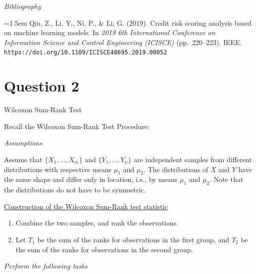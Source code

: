 \documentclass[letterpaper]{article}
\begin{document}
		\medskip
		
		\textit{Bibliography}
		
		\hangindent=1.5em
		Qiu, Z., Li, Y., Ni, P., \& Li, G. (2019). Credit risk scoring analysis based on machine learning models. In \textit{2019 6th International Conference on Information Science and Control Engineering (ICISCE)} (pp.\ 220--223). IEEE. \texttt{https://doi.org/10.1109/ICISCE48695.2019.00052}
		
		\clearpage
		
		\section{Question 2}
		{\color{deepred} Wilcoxon Sum-Rank Test}
		
		\medskip
		
		Recall the Wilcoxon Sum-Rank Test Procedure:
		
		\medskip
		
		\emph{Assumptions}
		
		\medskip
		
		Assume that $\{X_1,\dots,X_m\}$ and $\{Y_1,\dots,Y_n\}$ are independent samples from different distributions with respective means $\mu_1$ and $\mu_2$. The distributions of $X$ and $Y$ have the same shape and differ only in location, i.e., by means $\mu_1$ and $\mu_2$. Note that the distributions do not have to be symmetric.
		
		\medskip
		
		\underline{Construction of the Wilcoxon Sum-Rank test statistic}
		
		\begin{enumerate}
			\item[a] Combine the two samples, and rank the observations.
			
			\item[b] Let $T_1$ be the sum of the ranks for observations in the first group, and $T_2$ be the sum of the ranks for observations in the second group.
		\end{enumerate}
		
		\medskip
		
		\emph{Perform the following tasks}
		
\end{document}
